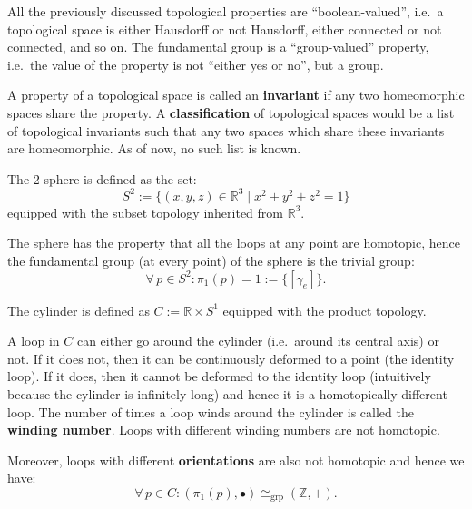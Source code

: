 \documentclass[root.tex]{subfiles}
\begin{document}
All the previously discussed topological properties are ``boolean-valued'', i.e.\ a topological space is either Hausdorff or not Hausdorff, either connected or not connected, and so on. The fundamental group is a ``group-valued'' property, i.e.\ the value of the property is not ``either yes or no'', but a group. 

A property of a topological space is called an \textbf{invariant} if any two homeomorphic spaces share the property. A \textbf{classification} of topological spaces would be a list of topological invariants such that any two spaces which share these invariants are homeomorphic. As of now, no such list is known. 

\begin{myex}
The 2-sphere is defined as the set:
$$
S^2:=\{(x,y,z)\in \mathbb{R}^3\mid x^2+y^2+z^2=1\}
$$
equipped with the subset topology inherited from $\mathbb{R}^3$.

\begin{center}
\end{center}

The sphere has the property that all the loops at any point are homotopic, hence the fundamental group (at every point) of the sphere is the trivial group:
$$
\forall \, p \in S^2 : \pi_1(p) = 1:=\{[\gamma_e]\}.
$$
\end{myex}

\begin{myex}
The cylinder is defined as $C:=\mathbb{R}\times S^1$ equipped with the product topology.

\begin{center}
\end{center}

A loop in $C$ can either go around the cylinder (i.e.\ around its central axis) or not. If it does not, then it can be continuously deformed to a point (the identity loop). If it does, then it cannot be deformed to the identity loop (intuitively because the cylinder is infinitely long) and hence it is a homotopically different loop. The number of times a loop winds around the cylinder is called the \textbf{winding number}. Loops with different winding numbers are not homotopic.

Moreover, loops with different \textbf{orientations} are also not homotopic and hence we have:
$$
\forall \, p \in C : (\pi_1(p),\bullet) \cong_\mathrm{grp}(\mathbb{Z},+).
$$
\end{myex}
\end{document}
